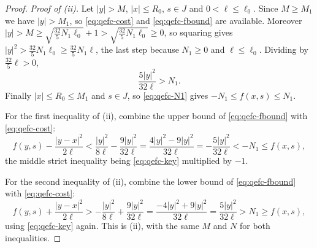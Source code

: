 \begin{proof}
\emph{Proof of (ii).}
Let $|y|>M$, $|x|\le R_0$, $s\in J$ and $0<\ell\le\ell_0$. Since $M\ge M_1$ we
have $|y|>M_1$, so \eqref{eq:qefc-cost} and \eqref{eq:qefc-fbound} are available.
Moreover
$|y|>M\ge\sqrt{\tfrac{32}5N_1\ell_0}+1>\sqrt{\tfrac{32}5N_1\ell_0}\ge0$, so
squaring gives $|y|^2>\tfrac{32}5N_1\ell_0\ge\tfrac{32}5N_1\ell$, the last step
because $N_1\ge0$ and $\ell\le\ell_0$. Dividing by $\tfrac{32}5\ell>0$,
\begin{equation}\label{eq:qefc-key}
  \frac{5|y|^2}{32\ell}>N_1 .
\end{equation}
Finally $|x|\le R_0\le M_1$ and $s\in J$, so \eqref{eq:qefc-N1} gives
$-N_1\le f(x,s)\le N_1$.

For the first inequality of (ii), combine the upper bound of
\eqref{eq:qefc-fbound} with \eqref{eq:qefc-cost}:
\[
  f(y,s)-\frac{|y-x|^2}{2\ell}
  <\frac{|y|^2}{8\ell}-\frac{9|y|^2}{32\ell}
  =\frac{4|y|^2-9|y|^2}{32\ell}
  =-\frac{5|y|^2}{32\ell}
  <-N_1\le f(x,s),
\]
the middle strict inequality being \eqref{eq:qefc-key} multiplied by $-1$.

For the second inequality of (ii), combine the lower bound of
\eqref{eq:qefc-fbound} with \eqref{eq:qefc-cost}:
\[
  f(y,s)+\frac{|y-x|^2}{2\ell}
  >-\frac{|y|^2}{8\ell}+\frac{9|y|^2}{32\ell}
  =\frac{-4|y|^2+9|y|^2}{32\ell}
  =\frac{5|y|^2}{32\ell}
  >N_1\ge f(x,s),
\]
using \eqref{eq:qefc-key} again. This is (ii), with the same $M$ and $N$ for both
inequalities.
\end{proof}
